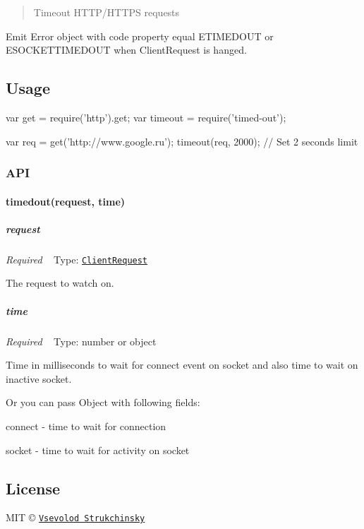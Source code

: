 \begin{quote}
Timeout H\+T\+T\+P/\+H\+T\+T\+PS requests \end{quote}


Emit Error object with {\ttfamily code} property equal {\ttfamily E\+T\+I\+M\+E\+D\+O\+UT} or {\ttfamily E\+S\+O\+C\+K\+E\+T\+T\+I\+M\+E\+D\+O\+UT} when Client\+Request is hanged.

\subsection*{Usage}


\begin{DoxyCode}
var get = require('http').get;
var timeout = require('timed-out');

var req = get('http://www.google.ru');
timeout(req, 2000); // Set 2 seconds limit
\end{DoxyCode}


\subsubsection*{A\+PI}

\paragraph*{timedout(request, time)}

\subparagraph*{request}

{\itshape Required} ~\newline
Type\+: \href{http://nodejs.org/api/http.html#http_class_http_clientrequest}{\tt {\ttfamily Client\+Request}}

The request to watch on.

\subparagraph*{time}

{\itshape Required} ~\newline
Type\+: {\ttfamily number} or {\ttfamily object}

Time in milliseconds to wait for {\ttfamily connect} event on socket and also time to wait on inactive socket.

Or you can pass Object with following fields\+:


\begin{DoxyItemize}
\item {\ttfamily connect} -\/ time to wait for connection
\item {\ttfamily socket} -\/ time to wait for activity on socket
\end{DoxyItemize}

\subsection*{License}

M\+IT © \href{floatdrop@gmail.com}{\tt Vsevolod Strukchinsky} 